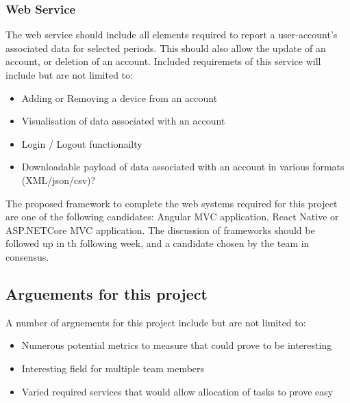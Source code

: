 \documentclass{article}
\begin{document}
            \subsubsection{Web Service}
            The web service should include all elements required to report a user-account's associated data
            for selected periods. This should also allow the update of an account, or deletion of an account.
            Included requiremets of this service will include but are not limited to:
            \begin{itemize}
                \item Adding or Removing a device from an account
                \item Visualisation of data associated with an account
                \item Login / Logout functionailty
                \item Downloadable payload of data associated with an account in various formats (XML/json/csv)?
            \end{itemize}
            \par
            The proposed framework to complete the web systems required for this project are one of the following 
            candidates: Angular MVC application\cite{Angular}, React Native\cite{ReactNative} or ASP.NETCore MVC 
            application\cite{ASP.NETcore-MVC}.
            The discussion of frameworks should be followed up in th following week, and a candidate chosen
            by the team in consensus.
            
            \newpage

            \subsection{Arguements for this project}
            A number of arguements for this project include but are not limited to:
            \begin{itemize}
                \item Numerous potential metrics to measure that could prove to be interesting
                \item Interesting field for multiple team members
                \item Varied required services that would allow allocation of tasks to prove easy
            \end{itemize}
\end{document}
